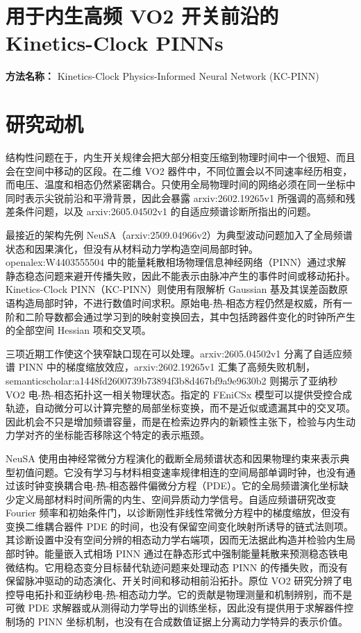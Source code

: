 \documentclass[10pt,a4paper]{article}
\begin{document}
\section*{用于内生高频 VO2 开关前沿的 Kinetics-Clock PINNs}
\textbf{方法名称：} Kinetics-Clock Physics-Informed Neural Network (KC-PINN)
\section*{研究动机}
结构性问题在于，内生开关规律会把大部分相变压缩到物理时间中一个很短、而且会在空间中移动的区段。在二维 VO2 器件中，不同位置会以不同速率经历相变，而电压、温度和相态仍然紧密耦合。只使用全局物理时间的网络必须在同一坐标中同时表示尖锐前沿和平滑背景，因此会暴露 arxiv:2602.19265v1 所强调的高频和残差条件问题，以及 arxiv:2605.04502v1 的自适应频谱诊断所指出的问题。

最接近的架构先例 NeuSA（arxiv:2509.04966v2）为典型波动问题加入了全局频谱状态和因果演化，但没有从材料动力学构造空间局部时钟。openalex:W4403555504 中的能量耗散相场物理信息神经网络（PINN）通过求解静态稳态问题来避开传播失败，因此不能表示由脉冲产生的事件时间或移动拓扑。Kinetics-Clock PINN（KC-PINN）则使用有限解析 Gaussian 基及其误差函数原语构造局部时钟，不进行数值时间求积。原始电-热-相态方程仍然是权威，所有一阶和二阶导数都会通过学习到的映射变换回去，其中包括跨器件变化的时钟所产生的全部空间 Hessian 项和交叉项。

三项近期工作使这个狭窄缺口现在可以处理。arxiv:2605.04502v1 分离了自适应频谱 PINN 中的梯度缩放效应，arxiv:2602.19265v1 汇集了高频失败机制，semanticscholar:a1448fd2600739b73894f3b8d467bf9a9e9630b2 则揭示了亚纳秒 VO2 电-热-相态拓扑这一相关物理状态。指定的 FEniCSx 模型可以提供受控合成轨迹，自动微分可以计算完整的局部坐标变换，而不是近似或遗漏其中的交叉项。因此机会不只是增加频谱容量，而是在检索边界内的新颖性主张下，检验与内生动力学对齐的坐标能否移除这个特定的表示瓶颈。

NeuSA 使用由神经常微分方程演化的截断全局频谱状态和因果物理约束来表示典型初值问题。它没有学习与材料相变速率规律相连的空间局部单调时钟，也没有通过该时钟变换耦合电-热-相态器件偏微分方程（PDE）。它的全局频谱演化坐标缺少定义局部材料时间所需的内生、空间异质动力学信号。自适应频谱研究改变 Fourier 频率和初始条件门，以诊断刚性非线性常微分方程中的梯度缩放，但没有变换二维耦合器件 PDE 的时间，也没有保留空间变化映射所诱导的链式法则项。其诊断设置中没有空间分辨的相态动力学右端项，因而无法据此构造并检验内生局部时钟。能量嵌入式相场 PINN 通过在静态形式中强制能量耗散来预测稳态铁电微结构。它用稳态变分目标替代轨迹问题来处理动态 PINN 的传播失败，而没有保留脉冲驱动的动态演化、开关时间和移动相前沿拓扑。原位 VO2 研究分辨了电控导电拓扑和亚纳秒电-热-相态动力学。它的贡献是物理测量和机制辨别，而不是可微 PDE 求解器或从测得动力学导出的训练坐标，因此没有提供用于求解器件控制场的 PINN 坐标机制，也没有在合成数值证据上分离动力学特异的表示价值。
\end{document}
